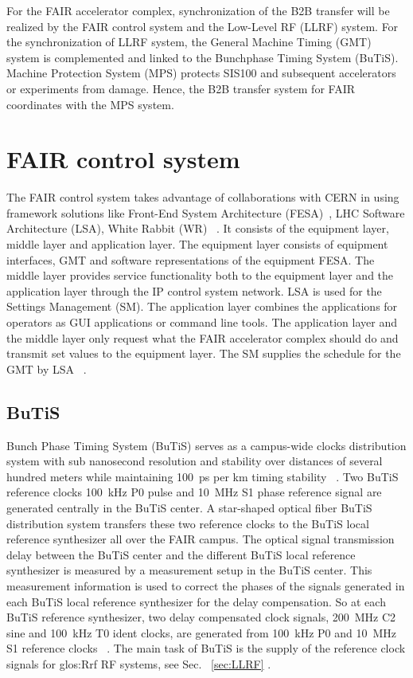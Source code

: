 
For the FAIR accelerator complex, synchronization of the B2B transfer will be realized by the FAIR control system and the Low-Level RF (LLRF) system. For the synchronization of LLRF system, the General Machine Timing (\gls{GMT}) system is complemented and linked to the Bunchphase Timing System (BuTiS). Machine Protection System (MPS) protects SIS100 and subsequent accelerators or experiments from damage. Hence, the B2B transfer system for FAIR coordinates with the MPS system. 
\section{FAIR control system}
The \gls{FAIR} control system takes advantage of collaborations with CERN in using framework solutions like Front-End System Architecture (\gls{FESA})~\cite{hoffmann_fesafront-end_2008}, LHC Software Architecture (\gls{LSA}), White Rabbit (\gls{WR}) ~\cite{huhmann_fair_2013}. It consists of the equipment layer, middle layer and application layer. The equipment layer consists of equipment interfaces, GMT and software representations of the equipment FESA. The middle layer provides service functionality both to the equipment layer and the application layer through the IP control system network. LSA is used for the Settings Management (SM). The application layer combines the applications for operators as \gls{GUI} applications or command line tools. The application layer and the middle layer only request what the FAIR accelerator complex should do and transmit set values to the equipment layer. The \gls{SM} supplies the schedule for the GMT by LSA ~\cite{huhmann_fair_2013, beck_new_2012}.

\subsection{BuTiS}
Bunch Phase Timing System (BuTiS) serves as a campus-wide clocks distribution system with sub nanosecond resolution and stability over distances of several hundred meters while maintaining \SI{100}{ps} per km timing stability ~\cite{moritz_butisdevelopment_2006}. Two BuTiS reference clocks \SI{100}{kHz} P0 pulse and \SI{10}{MHz} S1 phase reference signal are generated centrally in the BuTiS center. A star-shaped optical fiber BuTiS distribution system transfers these two reference clocks to the BuTiS local reference synthesizer all over the FAIR campus. The optical signal transmission delay between the BuTiS center and the different BuTiS local reference synthesizer is measured by a measurement setup in the BuTiS center. This measurement information is used to correct the phases of the signals generated in each BuTiS local reference synthesizer for the delay compensation. So at each BuTiS reference synthesizer, two delay compensated clock signals, \SI{200}{MHz} C2 sine and \SI{100}{kHz} T0 ident clocks, are generated from \SI{100}{kHz} P0 and \SI{10}{MHz} S1 reference clocks ~\cite{moritz_butisdevelopment_2006, zipfel_recent_2011}. The main task of BuTiS is the supply of the reference clock signals for \gls{glos:Rrf} RF systems, see Sec. ~\ref{sec:LLRF} .

